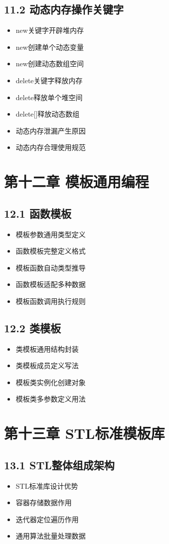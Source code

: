 \subsection{11.2 动态内存操作关键字}
\begin{itemize}
\item new关键字开辟堆内存
\item new创建单个动态变量
\item new创建动态数组空间
\item delete关键字释放内存
\item delete释放单个堆空间
\item delete[]释放动态数组
\item 动态内存泄漏产生原因
\item 动态内存合理使用规范
\end{itemize}

\section{第十二章 模板通用编程}
\subsection{12.1 函数模板}
\begin{itemize}
\item 模板参数通用类型定义
\item 函数模板完整定义格式
\item 模板函数自动类型推导
\item 函数模板适配多种数据
\item 模板函数调用执行规则
\end{itemize}

\subsection{12.2 类模板}
\begin{itemize}
\item 类模板通用结构封装
\item 类模板成员定义写法
\item 模板类实例化创建对象
\item 模板类多参数定义用法
\end{itemize}

\section{第十三章 STL标准模板库}
\subsection{13.1 STL整体组成架构}
\begin{itemize}
\item STL标准库设计优势
\item 容器存储数据作用
\item 迭代器定位遍历作用
\item 通用算法批量处理数据
\end{itemize}

